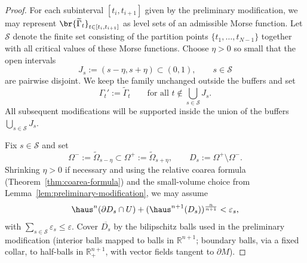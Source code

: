 \begin{lemma}
\begin{proof}
        For each subinterval $[t_i,t_{i+1}]$ given by the preliminary modification, we may represent
        $\br{\widetilde{\Gamma}_t}_{t\in[t_i,t_{i+1}]}$ as level sets of an admissible Morse function.
        Let $\mathcal{S}$ denote the finite set consisting of the partition points $\{t_1,\dots,t_{N-1}\}$ together
        with all critical values of these Morse functions. Choose $\eta>0$ so small that the open intervals
        \begin{equation*}
            J_s:=(s-\eta,s+\eta)\subset(0,1),\qquad s\in\mathcal{S}
        \end{equation*}
        are pairwise disjoint. We keep the family unchanged outside the buffers and set
        \begin{equation*}
            \Gamma_t':=\widetilde{\Gamma}_t\qquad\text{for all }t\notin \bigcup_{s\in\mathcal S}J_s.
        \end{equation*}
        All subsequent modifications will be supported inside the union of the buffers $\bigcup_{s\in\mathcal S}J_s$.
        
        Fix $s\in\mathcal S$ and set
        \begin{equation*}
            \Omega^-:=\widetilde{\Omega}_{s-\eta}\subset \Omega^+:=\widetilde{\Omega}_{s+\eta},
            \qquad
            D_s:=\Omega^+\setminus\Omega^-.
        \end{equation*}
        Shrinking $\eta>0$ if necessary and using the relative coarea formula (Theorem~\ref{thm:coarea-formula}) and the small-volume choice from Lemma~\ref{lem:preliminary-modification}, we may assume
        \begin{equation*}
          \haus^n(\partial D_s\cap U)+
          (\haus^{n+1}(D_s))^{\frac{n}{n+1}}
          <\varepsilon_s,
        \end{equation*}
        with $\sum_{s\in\mathcal S}\varepsilon_s\le \varepsilon$. Cover $\overline{D_s}$ by the bilipschitz balls used in the preliminary modification (interior balls mapped to balls in $\mathbb R^{n+1}$; boundary balls, via a fixed collar, to half-balls in $\mathbb R^{n+1}_+$, with vector fields tangent to $\partial M$).
        

\end{proof}
\end{lemma}
